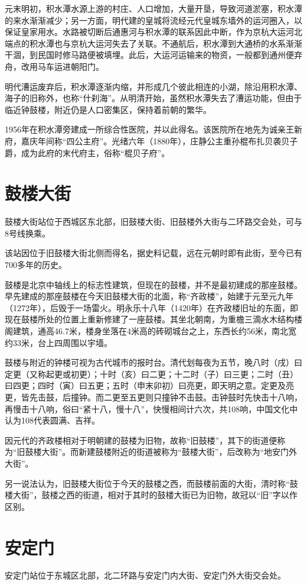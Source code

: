元末明初，积水潭水源上游的村庄、人口增加，大量开垦，导致河道淤塞，积水潭的来水渐渐减少；另一方面，明代建的皇城将流经元代皇城东墙外的运河圈入，以保证皇家用水。水路被切断后通惠河与积水潭的联系因此中断，作为京杭大运河北端点的积水潭也与京杭大运河失去了关联。不通航后，积水潭到大通桥的水系渐渐干涸，到民国时修马路便被填埋。此后，大运河运输来的物资，一般都到通州便弃舟，改用马车运进朝阳门。

明代漕运废弃后，积水潭逐渐内缩，并形成几个彼此相连的小湖，除沿用积水潭、海子的旧称外，也称“什刹海”。从明清开始，虽然积水潭失去了漕运功能，但由于临近钟鼓楼，附近仍是人口密集区，保持着前朝的繁华。

1956年在积水潭旁建成一所综合性医院，并以此得名。该医院所在地先为诚亲王新府，嘉庆年间称“四公主府”。光绪六年（1880年），庄静公主重孙棍布扎贝袭贝子爵，成为此府的末代府主，俗称“棍贝子府”。

\section{鼓楼大街}
鼓楼大街站位于西城区东北部，旧鼓楼大街、旧鼓楼外大街与二环路交会处，可与8号线换乘。

该站因位于旧鼓楼大街北侧而得名，据史料记载，远在元朝时即有此街，至今已有700多年的历史。

鼓楼是北京中轴线上的标志性建筑，但现在的鼓楼，并不是最初建成的那座鼓楼。早先建成的那座鼓楼在今天旧鼓楼大街的北面，称“齐政楼”，始建于元至元九年（1272年），后毁于一场雷火。明永乐十八年（1420年）在齐政楼旧址的东面，即现在鼓楼所处的位置上重新修建了一座鼓楼。其坐北朝南，为重檐三滴水木结构楼阁建筑，通高46.7米，楼身坐落在4米高的砖砌城台之上，东西长约56米，南北宽约33米，台上四周围以宇墙。

鼓楼与附近的钟楼可视为古代城市的报时台。清代划每夜为五节，晚八时（戌）曰定更（又称起更或初更）；十时（亥）曰二更；十二时（子）曰三更；二时（丑）曰四更；四时（寅）曰五更；五时（申末卯初）曰亮更，即天明之意。定更及亮更，皆先击鼓，后撞钟。而二更至五更则只撞钟不击鼓。击钟鼓时先快击十八响，再慢击十八响，俗曰“紧十八，慢十八”，快慢相间计六次，共108响，中国文化中认为108代表圆满、吉祥。

因元代的齐政楼相对于明朝建的鼓楼为旧物，故称“旧鼓楼”，其下的街道便称为“旧鼓楼大街”。而新建鼓楼附近的街道被称为“鼓楼大街”，后改称为“地安门外大街”。

另一说法认为，旧鼓楼大街位于今天的鼓楼之西，而鼓楼前面的大街，清时称“鼓楼大街”，鼓楼之西的街道，相对于其时的鼓楼大街已为旧物，故冠以“旧”字以作区别。

\section{安定门}
安定门站位于东城区北部，北二环路与安定门内大街、安定门外大街交会处。

